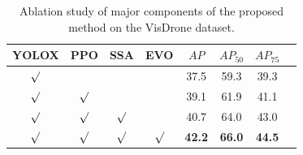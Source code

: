 \documentclass[letterpaper]{article} %
\begin{document}
\begin{table}[!t]
 \centering
  \begin{tabular}{cccccccc}
  \hline
  YOLOX & PPO & SSA & EVO & ${AP}$ & ${AP_{50}}$ & ${AP_{75}}$ \\
  \hline
  $\surd$ & & & & 37.5 & 59.3 & 39.3 \\
  $\surd$ & $\surd$ & & & 39.1 & 61.9 & 41.1 \\
  $\surd$ & $\surd$ & $\surd$ & & 40.7 & 64.0 & 43.0 \\
  $\surd$ & $\surd$ & $\surd$ & $\surd$ & \textbf{42.2} & \textbf{66.0} & \textbf{44.5} \\
  \hline
  \end{tabular}%
 \caption{Ablation study of major components of the proposed method on the VisDrone dataset. 
 }
 \label{tab:ablation}%
\end{table}%


\end{document}
